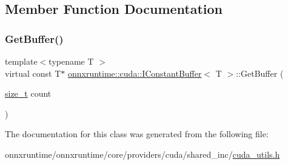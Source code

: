 \subsection{Member Function Documentation}
\mbox{\label{classonnxruntime_1_1cuda_1_1IConstantBuffer_a855f00d4a419a2847a607319c5f20dfc}} 
\subsubsection{\texorpdfstring{Get\+Buffer()}{GetBuffer()}}
{\footnotesize\ttfamily template$<$typename T $>$ \\
virtual const T$\ast$ \mbox{\hyperlink{classonnxruntime_1_1cuda_1_1IConstantBuffer}{onnxruntime\+::cuda\+::\+I\+Constant\+Buffer}}$<$ T $>$\+::Get\+Buffer (\begin{DoxyParamCaption}\item[{\mbox{\hyperlink{mlasi_8h_a503efbc1c6e50825320ad909366b78ab}{size\+\_\+t}}}]{count }\end{DoxyParamCaption})\hspace{0.3cm}{\ttfamily [pure virtual]}}



The documentation for this class was generated from the following file\+:\begin{DoxyCompactItemize}
\item 
onnxruntime/onnxruntime/core/providers/cuda/shared\+\_\+inc/\mbox{\hyperlink{cuda__utils_8h}{cuda\+\_\+utils.\+h}}\end{DoxyCompactItemize}
